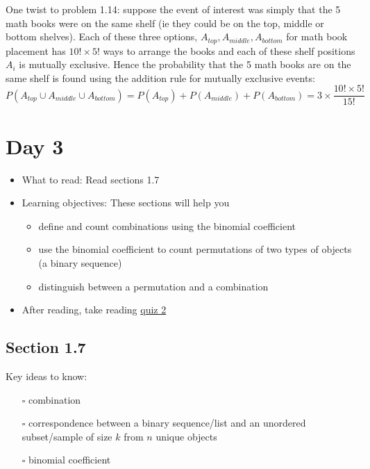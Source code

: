 \documentclass[
  letterpaper,
]{scrbook}
\providecommand{\tightlist}{%
  \setlength{\itemsep}{0pt}\setlength{\parskip}{0pt}}\usepackage{longtable,booktabs,array}
\begin{document}
One twist to problem 1.14: suppose the event of interest was simply that
the 5 math books were on the same shelf (ie they could be on the top,
middle or bottom shelves). Each of these three options,
\(A_{top}, A_{middle}, A_{bottom}\) for math book placement has
\(10! \times 5!\) ways to arrange the books and each of these shelf
positions \(A_{i}\) is mutually exclusive. Hence the probability that
the 5 math books are on the same shelf is found using the addition rule
for mutually exclusive events: \[
P(A_{top} \cup A_{middle} \cup A_{bottom}) = P(A_{top}) + P(A_{middle}) +  P(A_{bottom}) = 3 \times \dfrac{10! \times 5!}{15!}
\]

\section*{Day 3}\label{day-3}


\begin{itemize}
\item
  What to read: Read sections 1.7
\item
  Learning objectives: These sections will help you

  \begin{itemize}
  \tightlist
  \item
    define and count combinations using the binomial coefficient
  \item
    use the binomial coefficient to count permutations of two types of
    objects (a binary sequence)
  \item
    distinguish between a permutation and a combination
  \end{itemize}
\item
  After reading, take reading
  \href{https://forms.gle/D5hXDdpzE5mcBLkaA}{quiz 2}
\end{itemize}

\subsection*{Section 1.7}\label{section-1.7}

Key ideas to know:

\begin{itemize}
\tightlist
\item[$\square$]
  combination
\item[$\square$]
  correspondence between a binary sequence/list and an unordered
  subset/sample of size \(k\) from \(n\) unique objects
\item[$\square$]
  binomial coefficient
\end{itemize}
\end{document}
